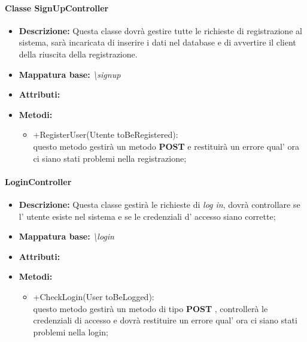 \paragraph{Classe SignUpController}%
\begin{itemize}
	\item \textbf{Descrizione: } Questa classe dovrà gestire tutte le richieste di registrazione al sistema, sarà incaricata di inserire i dati nel database e di avvertire il client della riuscita della registrazione.
	\item \textbf{Mappatura base: }\textit{\textbackslash signup}
	\item \textbf{Attributi: }
	\item \textbf{Metodi: }\begin{itemize}
					\item +RegisterUser(Utente toBeRegistered):\\
					 questo metodo gestirà un metodo \textbf{POST} e restituirà un errore qual' ora ci siano stati problemi nella registrazione;
				\end{itemize}
\end{itemize}
\paragraph{LoginController}%
\begin{itemize}
	\item \textbf{Descrizione: }Questa classe gestirà le richieste di \textit{log in}, dovrà controllare se l' utente esiste nel sistema e se le credenziali d' accesso siano corrette;
	\item \textbf{Mappatura base: }\textit{\textbackslash login}
	\item \textbf{Attributi: }
	\item \textbf{Metodi: }\begin{itemize}
					\item +CheckLogin(User toBeLogged):\\
					 questo metodo gestirà un metodo di tipo \textbf{POST} , controllerà le credenziali di accesso e dovrà restituire un errore qual' ora ci siano stati problemi nella login;
				\end{itemize}
\end{itemize}
